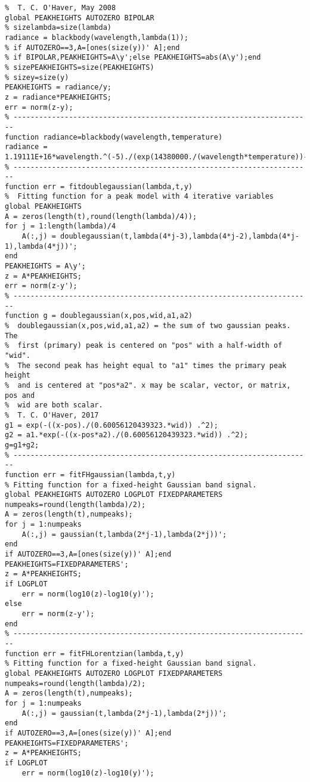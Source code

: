 \begin{lstlisting}
%  T. C. O'Haver, May 2008
global PEAKHEIGHTS AUTOZERO BIPOLAR
% sizelambda=size(lambda)
radiance = blackbody(wavelength,lambda(1));
% if AUTOZERO==3,A=[ones(size(y))' A];end
% if BIPOLAR,PEAKHEIGHTS=A\y';else PEAKHEIGHTS=abs(A\y');end
% sizePEAKHEIGHTS=size(PEAKHEIGHTS)
% sizey=size(y)
PEAKHEIGHTS = radiance/y;
z = radiance*PEAKHEIGHTS;
err = norm(z-y);
% ----------------------------------------------------------------------
function radiance=blackbody(wavelength,temperature)
radiance = 1.19111E+16*wavelength.^(-5)./(exp(14380000./(wavelength*temperature))-1);
% ----------------------------------------------------------------------
function err = fitdoublegaussian(lambda,t,y)
%  Fitting function for a peak model with 4 iterative variables
global PEAKHEIGHTS
A = zeros(length(t),round(length(lambda)/4));
for j = 1:length(lambda)/4
    A(:,j) = doublegaussian(t,lambda(4*j-3),lambda(4*j-2),lambda(4*j-1),lambda(4*j))';
end
PEAKHEIGHTS = A\y';
z = A*PEAKHEIGHTS;
err = norm(z-y');
% ----------------------------------------------------------------------
function g = doublegaussian(x,pos,wid,a1,a2)
%  doublegaussian(x,pos,wid,a1,a2) = the sum of two gaussian peaks. The
%  first (primary) peak is centered on "pos" with a half-width of "wid".
%  The second peak has height equal to "a1" times the primary peak height
%  and is centered at "pos*a2". x may be scalar, vector, or matrix, pos and
%  wid are both scalar.
%  T. C. O'Haver, 2017
g1 = exp(-((x-pos)./(0.60056120439323.*wid)) .^2);
g2 = a1.*exp(-((x-pos*a2)./(0.60056120439323.*wid)) .^2);
g=g1+g2;
% ----------------------------------------------------------------------
function err = fitFHgaussian(lambda,t,y)
% Fitting function for a fixed-height Gaussian band signal.
global PEAKHEIGHTS AUTOZERO LOGPLOT FIXEDPARAMETERS
numpeaks=round(length(lambda)/2);
A = zeros(length(t),numpeaks);
for j = 1:numpeaks
    A(:,j) = gaussian(t,lambda(2*j-1),lambda(2*j))';
end 
if AUTOZERO==3,A=[ones(size(y))' A];end
PEAKHEIGHTS=FIXEDPARAMETERS';
z = A*PEAKHEIGHTS;
if LOGPLOT
    err = norm(log10(z)-log10(y)');
else
    err = norm(z-y');
end
% ----------------------------------------------------------------------
function err = fitFHLorentzian(lambda,t,y)
% Fitting function for a fixed-height Gaussian band signal.
global PEAKHEIGHTS AUTOZERO LOGPLOT FIXEDPARAMETERS
numpeaks=round(length(lambda)/2);
A = zeros(length(t),numpeaks);
for j = 1:numpeaks
    A(:,j) = gaussian(t,lambda(2*j-1),lambda(2*j))';
end 
if AUTOZERO==3,A=[ones(size(y))' A];end
PEAKHEIGHTS=FIXEDPARAMETERS';
z = A*PEAKHEIGHTS;
if LOGPLOT
    err = norm(log10(z)-log10(y)');

\end{lstlisting}

